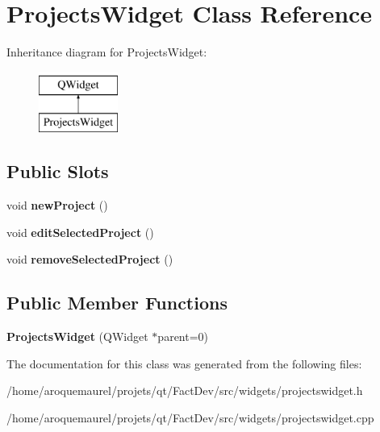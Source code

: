 \hypertarget{classProjectsWidget}{\section{Projects\-Widget Class Reference}
\label{classProjectsWidget}
}
Inheritance diagram for Projects\-Widget\-:\begin{figure}[H]
\begin{center}
\leavevmode
\includegraphics[height=2.000000cm]{de/da7/classProjectsWidget}
\end{center}
\end{figure}
\subsection*{Public Slots}
\begin{DoxyCompactItemize}
\item 
\hypertarget{classProjectsWidget_a9a3e158093ed435a68d4d9874a22a128}{void {\bfseries new\-Project} ()}\label{classProjectsWidget_a9a3e158093ed435a68d4d9874a22a128}

\item 
\hypertarget{classProjectsWidget_a026e17f035717e382f4afca6896a72d3}{void {\bfseries edit\-Selected\-Project} ()}\label{classProjectsWidget_a026e17f035717e382f4afca6896a72d3}

\item 
\hypertarget{classProjectsWidget_a038205ca1dee68dadae84e31dabfd7fc}{void {\bfseries remove\-Selected\-Project} ()}\label{classProjectsWidget_a038205ca1dee68dadae84e31dabfd7fc}

\end{DoxyCompactItemize}
\subsection*{Public Member Functions}
\begin{DoxyCompactItemize}
\item 
\hypertarget{classProjectsWidget_a542fb678c61897b56c86dc58524bd969}{{\bfseries Projects\-Widget} (Q\-Widget $\ast$parent=0)}\label{classProjectsWidget_a542fb678c61897b56c86dc58524bd969}

\end{DoxyCompactItemize}


The documentation for this class was generated from the following files\-:\begin{DoxyCompactItemize}
\item 
/home/aroquemaurel/projets/qt/\-Fact\-Dev/src/widgets/projectswidget.\-h\item 
/home/aroquemaurel/projets/qt/\-Fact\-Dev/src/widgets/projectswidget.\-cpp\end{DoxyCompactItemize}
